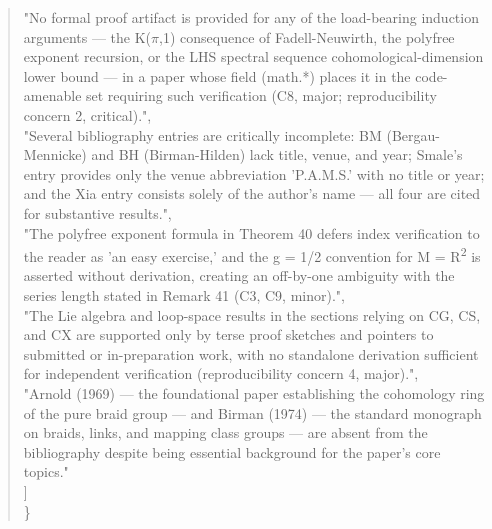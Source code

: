 \documentclass[11pt]{article}
\begin{document}
\begin{quote}
    "No formal proof artifact is provided for any of the load-bearing induction arguments --- the K(\ensuremath{\pi},1) consequence of Fadell-Neuwirth, the polyfree exponent recursion, or the LHS spectral sequence cohomological-dimension lower bound --- in a paper whose field (math.*) places it in the code-amenable set requiring such verification (C8, major; reproducibility concern 2, critical).",\\
    "Several bibliography entries are critically incomplete: BM (Bergau-Mennicke) and BH (Birman-Hilden) lack title, venue, and year; Smale's entry provides only the venue abbreviation 'P.A.M.S.' with no title or year; and the Xia entry consists solely of the author's name --- all four are cited for substantive results.",\\
    "The polyfree exponent formula in Theorem 40 defers index verification to the reader as 'an easy exercise,' and the g = 1/2 convention for M = R\textsuperscript{2} is asserted without derivation, creating an off-by-one ambiguity with the series length stated in Remark 41 (C3, C9, minor).",\\
    "The Lie algebra and loop-space results in the sections relying on CG, CS, and CX are supported only by terse proof sketches and pointers to submitted or in-preparation work, with no standalone derivation sufficient for independent verification (reproducibility concern 4, major).",\\
    "Arnold (1969) --- the foundational paper establishing the cohomology ring of the pure braid group --- and Birman (1974) --- the standard monograph on braids, links, and mapping class groups --- are absent from the bibliography despite being essential background for the paper's core topics."\\
  ]\\
\}\\
\end{quote}
\end{document}

